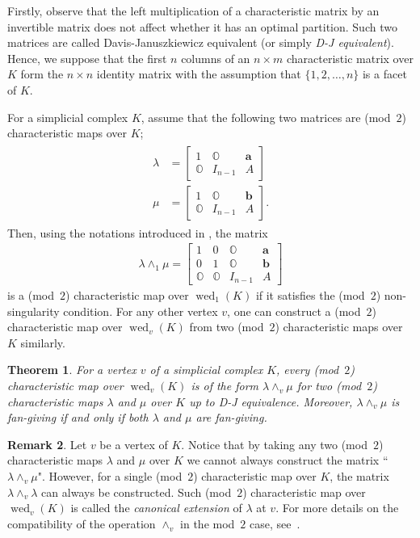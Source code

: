 \documentclass[11pt]{amsart}
\theoremstyle{plain}
\newtheorem{theorem}{Theorem}[section]
\numberwithin{equation}{section}
\theoremstyle{definition}
\newtheorem{remark}[theorem]{Remark}
\DeclareMathOperator{\wed}{wed}
\begin{document}
Firstly, observe that the left multiplication of a characteristic matrix by an invertible matrix does not affect whether it has an optimal partition.
Such two matrices are called Davis-Januszkiewicz equivalent (or simply \emph{D-J equivalent}).
Hence, we suppose that the first $n$ columns of an $n \times m$ characteristic matrix over $K$ form the $n \times n$ identity matrix with the assumption that $\{1, 2, \ldots, n\}$ is a facet of $K$.

For a simplicial complex $K$, assume that the following two matrices are (mod~$2$) characteristic maps over $K$;
\begin{align} \label{equation: characteristic maps} \begin{split} \lambda &=\begin{bmatrix} 1 & \mathds{O} & \textbf{a} \\
			\mathds{O} & I_{n-1} & A
		\end{bmatrix}\\
		\mu &=\begin{bmatrix} 1 & \mathds{O} & \textbf{b} \\
			\mathds{O} & I_{n-1} & A
		\end{bmatrix}.
	\end{split}
\end{align}
Then, using the notations introduced in \cite{Choi-Vallee2022}, the matrix \begin{align} \label{equation: wedged characteristic map}
	\lambda \wedge_1 \mu = \begin{bmatrix}
		1 & 0 & \mathds{O} & \textbf{a} \\
		0 & 1 & \mathds{O} & \textbf{b} \\
		\mathds{O} & \mathds{O} & I_{n-1} & A
	\end{bmatrix}
\end{align}
is a (mod~$2$) characteristic map over $\wed_1(K)$ if it satisfies the (mod~$2$) non-singularity condition.
For any other vertex $v$, one can construct a (mod~$2$) characteristic map over $\wed_v(K)$ from two (mod~$2$) characteristic maps over $K$ similarly.

\begin{theorem}{\cite{Choi-Park2016}} \label{theorem: wedge fan-giving}
	For a vertex $v$ of a simplicial complex $K$, every (mod~$2$) characteristic map over $\wed_v(K)$ is of the form $\lambda \wedge_v \mu$ for two (mod~$2$) characteristic maps $\lambda$ and $\mu$ over $K$ up to D-J equivalence.
	Moreover, $\lambda \wedge_v \mu$ is fan-giving if and only if both $\lambda$ and $\mu$ are fan-giving.
\end{theorem}
\begin{remark}
	Let $v$ be a vertex of $K$.
	Notice that by taking any two (mod~$2$) characteristic maps $\lambda$ and $\mu$ over $K$ we cannot always construct the matrix ``$\lambda\wedge_v \mu$".
	However, for a single (mod~$2$) characteristic map over $K$, the matrix $\lambda \wedge_v \lambda$ can always be constructed.
	Such (mod~$2$) characteristic map over $\wed_v(K)$ is called the \emph{canonical extension} of $\lambda$ at $v$.
	For more details on the compatibility of the operation $\wedge_v$ in the mod~$2$ case, see~\cite{Choi-Vallee2022}.
\end{remark}
\end{document}
